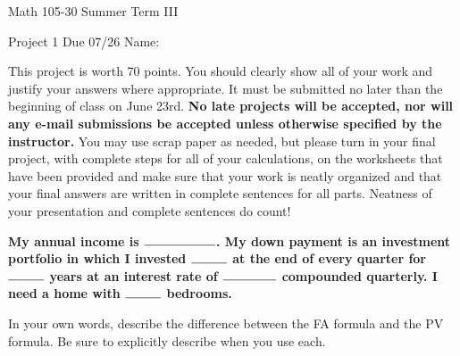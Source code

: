 \documentclass[11pt,epsfig]{article}
\begin{document}
Math 105-30 Summer Term III 

Project 1  Due 07/26\hspace{1in} {Name:} {\underline {\hspace{3.5in}}}
\vspace{2pc}

This project is worth 70 points. You should clearly show all of your work and justify your answers where appropriate. It must be submitted no later than the beginning of class on June 23rd. \textbf{No late projects will be accepted, nor will any e-mail submissions be accepted unless otherwise specified by the instructor.} You may use scrap paper as needed, but please turn in your final project, with complete steps for all of your calculations, on the worksheets that have been provided and make sure that your work is neatly organized and that your final answers are written in complete sentences for all parts. Neatness of your presentation and complete sentences do count! \bigskip


\noindent \textbf{My annual income is $\rule{2cm}{0.15mm}$. My down payment is an investment portfolio in which I invested $\rule{1cm}{0.15mm}$ at the end of every quarter for $\rule{1cm}{0.15mm}$ years at an interest rate of $\rule{1.5cm}{0.15mm}$ compounded quarterly. I need a home with $\rule{1cm}{0.15mm}$ bedrooms.}
\vspace{2pc}

\begin{problem}{5}
In your own words, describe the difference between the FA formula and the PV formula. Be sure to explicitly describe when you use each. 

\vfill
\end{problem}
\end{document}
